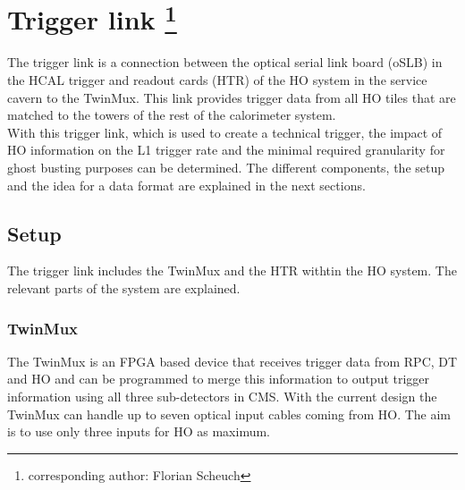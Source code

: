 \section[Trigger link]{Trigger link \footnote{corresponding author: Florian Scheuch}}
The trigger link is a connection between the optical serial link board (oSLB) in the HCAL trigger and readout cards (HTR) of the HO system in the service cavern to the TwinMux. This link provides trigger data from all HO tiles that are matched to the towers of the rest of the calorimeter system.\\
With this trigger link, which is used to create a technical trigger, the impact of HO information on the L1 trigger rate and the minimal required granularity for ghost busting purposes can be determined.
The different components, the setup and the idea for a data format are explained in the next sections.
\subsection{Setup}
The trigger link includes the TwinMux and the HTR withtin the HO system. The relevant parts of the system are explained.
\subsubsection{TwinMux}
The TwinMux is an FPGA based device that receives trigger data from RPC, DT and HO and can be programmed to merge this information to output trigger information using all three sub-detectors in CMS. With the current design the TwinMux can handle up to seven optical input cables coming from HO. The aim is to use only three inputs for HO as maximum.
